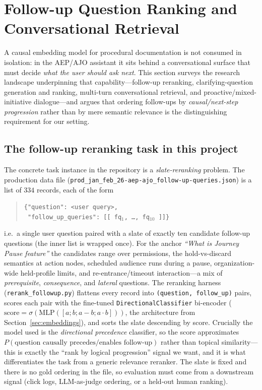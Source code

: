 \section{Follow-up Question Ranking and Conversational Retrieval}
\label{sec:followup}

A causal embedding model for procedural documentation is not consumed in
isolation: in the AEP/AJO assistant it sits behind a conversational surface
that must decide \emph{what the user should ask next}. This section surveys the
research landscape underpinning that capability---follow-up reranking,
clarifying-question generation and ranking, multi-turn conversational
retrieval, and proactive/mixed-initiative dialogue---and argues that ordering
follow-ups by \emph{causal/next-step progression} rather than by mere semantic
relevance is the distinguishing requirement for our setting.

\subsection{The follow-up reranking task in this project}

The concrete task instance in the repository is a \emph{slate-reranking}
problem. The production data file
(\texttt{prod\_jan\_feb\_26-aep-ajo\_follow-up-queries.json}) is a list of
$334$ records, each of the form
\begin{quote}\small
\texttt{\{"question": <user query>,}\\
\texttt{ "follow\_up\_queries": [[ fq$_1$, \dots, fq$_{10}$ ]]\}}
\end{quote}
i.e.\ a single user question paired with a slate of exactly ten candidate
follow-up questions (the inner list is wrapped once). For the anchor
\emph{``What is Journey Pause feature''} the candidates range over permissions,
the hold-vs-discard semantics at action nodes, scheduled audience runs during a
pause, organization-wide held-profile limits, and re-entrance/timeout
interaction---a mix of \emph{prerequisite}, \emph{consequence}, and
\emph{lateral} questions. The reranking harness
(\texttt{rerank\_followup.py}) flattens every record into
\texttt{(question, follow\_up)} pairs, scores each pair with the fine-tuned
\texttt{DirectionalClassifier} bi-encoder
($\mathrm{score}=\sigma(\text{MLP}([a;b;a-b;a\!\cdot\!b]))$, the architecture
from Section~\ref{sec:embeddings}), and sorts the slate descending by score.
Crucially the model used is the \emph{directional precedence} classifier, so
the score approximates $P(\text{question causally precedes/enables follow-up})$
rather than topical similarity---this is exactly the ``rank by logical
progression'' signal we want, and it is what differentiates the task from a
generic relevance reranker. The slate is fixed and there is no gold ordering in
the file, so evaluation must come from a downstream signal (click logs,
LLM-as-judge ordering, or a held-out human ranking).

